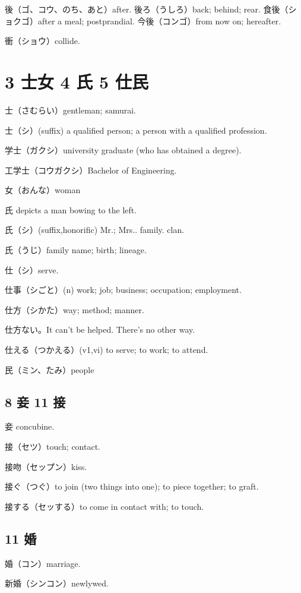 後（ゴ、コウ、のち、あと）after.
後ろ（うしろ）back; behind; rear.
食後（ショクゴ）after a meal; postprandial.
今後（コンゴ）from now on; hereafter.

衝（ショウ）collide.

\section{3 士女 4 氏 5 仕民}

士（さむらい）gentleman; samurai.

士（シ）(suffix)
a qualified person;
a person with a qualified profession.

学士（ガクシ）university graduate (who has obtained a degree).

工学士（コウガクシ）Bachelor of Engineering.

女（おんな）woman

氏 depicts a man bowing to the left.

氏（シ）(suffix,honorific) Mr.; Mrs.. family. clan.

氏（うじ）family name; birth; lineage.

仕（シ）serve.

仕事（シごと）(n) work; job; business; occupation; employment.

仕方（シかた）way; method; manner.

仕方ない。It can't be helped. There's no other way.

仕える（つかえる）(v1,vi) to serve; to work; to attend.

民（ミン、たみ）people

\subsection{8 妾 11 接}

妾 concubine.

接（セツ）touch; contact.

接吻（セップン）kiss.

接ぐ（つぐ）to join (two things into one); to piece together; to graft.

接する（セッする）to come in contact with; to touch.

\subsection{11 婚}

婚（コン）marriage.

新婚（シンコン）newlywed.

